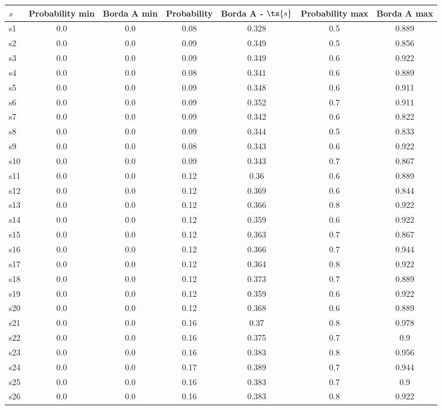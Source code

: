 \documentclass{article}
\begin{document}
\noindent\begin{tabular}{|l|c|c|c|c|c|c|}
\hline
$s$& Probability min & Borda A min & Probability & Borda A - $\ts{s}$ & Probability max & Borda A max\\
\hline
s1 &0.0 & 0.0 & 0.08 & 0.328 & 0.5 & 0.889\\
\hline
s2 &0.0 & 0.0 & 0.09 & 0.349 & 0.5 & 0.856\\
\hline
s3 &0.0 & 0.0 & 0.09 & 0.349 & 0.6 & 0.922\\
\hline
s4 &0.0 & 0.0 & 0.08 & 0.341 & 0.6 & 0.889\\
\hline
s5 &0.0 & 0.0 & 0.09 & 0.348 & 0.6 & 0.911\\
\hline
s6 &0.0 & 0.0 & 0.09 & 0.352 & 0.7 & 0.911\\
\hline
s7 &0.0 & 0.0 & 0.09 & 0.342 & 0.6 & 0.822\\
\hline
s8 &0.0 & 0.0 & 0.09 & 0.344 & 0.5 & 0.833\\
\hline
s9 &0.0 & 0.0 & 0.08 & 0.343 & 0.6 & 0.922\\
\hline
s10 &0.0 & 0.0 & 0.09 & 0.343 & 0.7 & 0.867\\
\hline
s11 &0.0 & 0.0 & 0.12 & 0.36 & 0.6 & 0.889\\
\hline
s12 &0.0 & 0.0 & 0.12 & 0.369 & 0.6 & 0.844\\
\hline
s13 &0.0 & 0.0 & 0.12 & 0.366 & 0.8 & 0.922\\
\hline
s14 &0.0 & 0.0 & 0.12 & 0.359 & 0.6 & 0.922\\
\hline
s15 &0.0 & 0.0 & 0.12 & 0.363 & 0.7 & 0.867\\
\hline
s16 &0.0 & 0.0 & 0.12 & 0.366 & 0.7 & 0.944\\
\hline
s17 &0.0 & 0.0 & 0.12 & 0.364 & 0.8 & 0.922\\
\hline
s18 &0.0 & 0.0 & 0.12 & 0.373 & 0.7 & 0.889\\
\hline
s19 &0.0 & 0.0 & 0.12 & 0.359 & 0.6 & 0.922\\
\hline
s20 &0.0 & 0.0 & 0.12 & 0.368 & 0.6 & 0.889\\
\hline
s21 &0.0 & 0.0 & 0.16 & 0.37 & 0.8 & 0.978\\
\hline
s22 &0.0 & 0.0 & 0.16 & 0.375 & 0.7 & 0.9\\
\hline
s23 &0.0 & 0.0 & 0.16 & 0.383 & 0.8 & 0.956\\
\hline
s24 &0.0 & 0.0 & 0.17 & 0.389 & 0.7 & 0.944\\
\hline
s25 &0.0 & 0.0 & 0.16 & 0.383 & 0.7 & 0.9\\
\hline
s26 &0.0 & 0.0 & 0.16 & 0.383 & 0.8 & 0.922\\

\end{tabular}
\end{document}
